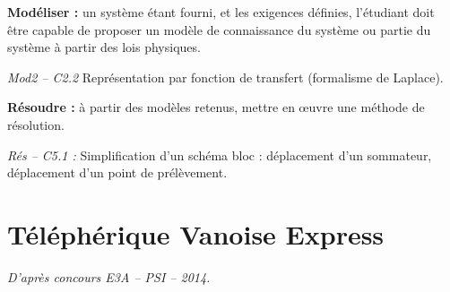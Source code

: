 \documentclass[10pt]{article}
\newif\ifprof
\begin{document}






\begin{comp}
\noindent \textbf{Modéliser :} un système étant fourni, et les exigences définies, l’étudiant doit être capable de proposer un modèle de connaissance du système ou partie du système à partir des lois physiques.

\noindent \textit{Mod2 -- C2.2} Représentation par fonction de transfert (formalisme de Laplace).

\noindent \textbf{Résoudre :} à partir des modèles retenus, mettre en œuvre une méthode de résolution.
 
\noindent \textit{Rés -- C5.1 :} Simplification d’un schéma bloc : déplacement d’un sommateur, déplacement d’un point de prélèvement.
\end{comp}

\section*{Téléphérique Vanoise Express}

\begin{flushright}
\textit{D'après concours E3A -- PSI -- 2014.}
\end{flushright}

\ifprof
\else
\end{document}
